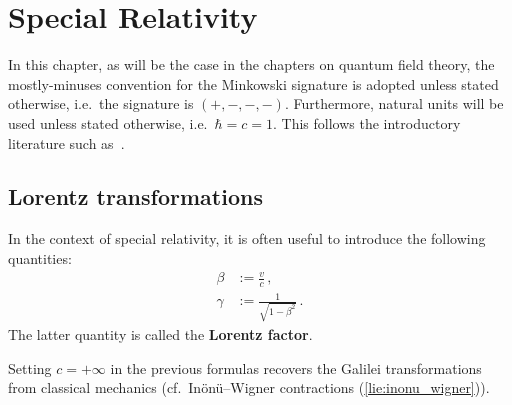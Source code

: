 \chapter{Special Relativity}

    In this chapter, as will be the case in the chapters on quantum field theory, the mostly-minuses convention for the Minkowski signature is adopted unless stated otherwise, i.e.~the signature is $(+,-,-,-)$. Furthermore, natural units will be used unless stated otherwise, i.e.~$\hbar = c = 1$. This follows the introductory literature such as~\citet{greiner_field_1996,peskin_introduction_1995}.

\section{Lorentz transformations}

    \begin{notation}
        In the context of special relativity, it is often useful to introduce the following quantities:
        \begin{align}
            \beta &:= \frac{v}{c}\,,\\
            \label{relativity:lorentz_factor}
            \gamma &:= \frac{1}{\sqrt{1 - \beta^2}}\,.
        \end{align}
        The latter quantity is called the \textbf{Lorentz factor}.
    \end{notation}
    \begin{remark}
        Setting $c=+\infty$ in the previous formulas recovers the Galilei transformations from classical mechanics (cf.~In\"on\"u--Wigner contractions (\cref{lie:inonu_wigner})).
    \end{remark}

